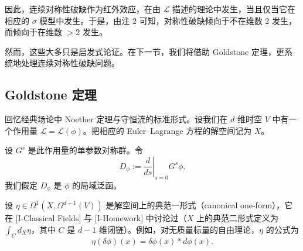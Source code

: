 
因此，连续对称性破缺作为红外效应，在由 $\mathcal{L}$ 描述的理论中发生，当且仅当它在相应的 $\sigma$ 模型中发生。于是，由注 2 可知，对称性破缺倾向于不在维数 2 发生，而倾向于在维数 $>2$ 发生。

然而，这些大多只是启发式论证。在下一节，我们将借助 Goldstone 定理，更系统地处理连续对称性破缺问题。

\subsection{Goldstone 定理}

回忆经典场论中 Noether 定理与守恒流的标准形式。设我们在 $d$ 维时空 $V$ 中有一个作用量 $\mathcal{L}=\mathcal{L}(\phi)$。把相应的 Euler–Lagrange 方程的解空间记为 $X$。

设 $G^s$ 是此作用量的单参数对称群。令
\[
D_\phi:=\left.\frac{d}{ds}\right|_{s=0}G^s\phi .
\]
我们假定 $D_\phi$ 是 $\phi$ 的局域泛函。

设 $\eta\in\Omega^1(X,\Omega^{d-1}(V))$ 是解空间上的典范一形式（canonical one-form），它在 [I-Classical Fields] 与 [I-Homework] 中讨论过（$X$ 上的典范二形式定义为 $\int_C d_X\eta$，其中 $C$ 是 $d-1$ 维闭链）。例如，对无质量标量的自由理论，$\eta$ 的公式为
\begin{equation}
  \tag{1.17}
  \label{eq:1-17}
  \eta(\delta\phi)(x)=\delta\phi(x)*d\phi(x).
\end{equation}


